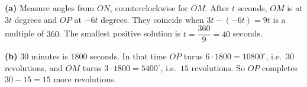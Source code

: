 \textbf{(a)} Measure angles from $ON$, counterclockwise for $OM$. After $t$ seconds, $OM$ is at $3t$ degrees and $OP$ at $-6t$ degrees. They coincide when $3t-(-6t)=9t$ is a multiple of $360$. The smallest positive solution is $t=\dfrac{360}{9}=\boxed{40}$ seconds.

\textbf{(b)} $30$ minutes is $1800$ seconds. In that time $OP$ turns $6\cdot1800=10800^\circ$, i.e.\ $30$ revolutions, and $OM$ turns $3\cdot1800=5400^\circ$, i.e.\ $15$ revolutions. So $OP$ completes $30-15=\boxed{15}$ more revolutions.
